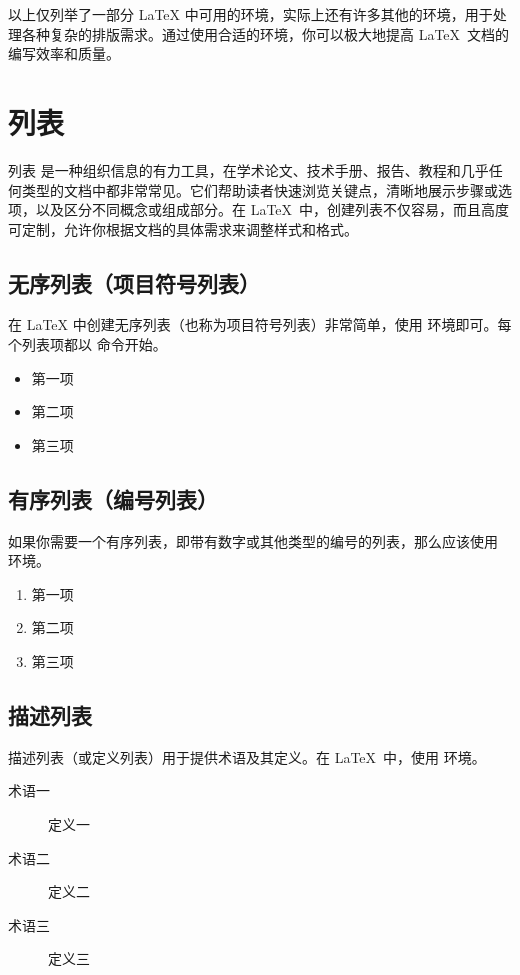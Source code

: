 {以上仅列举了一部分 \LaTeX
中可用的环境，实际上还有许多其他的环境，用于处理各种复杂的排版需求。通过使用合适的环境，你可以极大地提高 \LaTeX\ 文档的编写效率和质量。

\section{列表}
列表
是一种组织信息的有力工具，在学术论文、技术手册、报告、教程和几乎任何类型的文档中都非常常见。它们帮助读者快速浏览关键点，清晰地展示步骤或选项，以及区分不同概念或组成部分。在
\LaTeX\ 中，创建列表不仅容易，而且高度可定制，允许你根据文档的具体需求来调整样式和格式。
\subsection{无序列表（项目符号列表）}
在 LaTeX 中创建无序列表（也称为项目符号列表）非常简单，使用  环境即可。每个列表项都以 \texinline{\item} 命令开始。
\begin{texlst}
	\begin{itemize}
		\item 第一项
		\item 第二项
		\item 第三项
	\end{itemize}
\end{texlst}

\subsection{有序列表（编号列表）}
如果你需要一个有序列表，即带有数字或其他类型的编号的列表，那么应该使用  环境。
\begin{texlst}
	\begin{enumerate}
		\item 第一项
		\item 第二项
		\item 第三项
	\end{enumerate}
\end{texlst}

\subsection{描述列表}
描述列表（或定义列表）用于提供术语及其定义。在 \LaTeX\ 中，使用  环境。
\begin{texlst}
	\begin{description}
		\item[术语一] 定义一
		\item[术语二] 定义二
		\item[术语三] 定义三
	\end{description}
\end{texlst}

}
